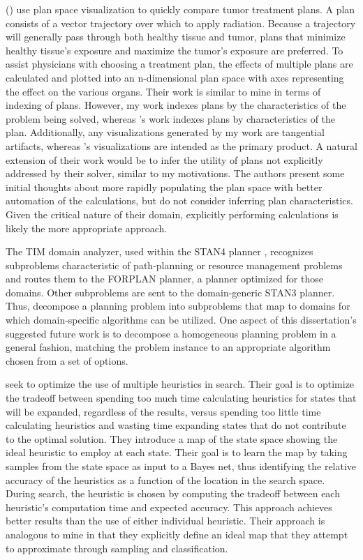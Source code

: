 \citeauthor{gopal02plan} (\citeyear{gopal02plan}) use plan space visualization to quickly compare tumor treatment plans.  A plan consists of a vector trajectory over which to apply radiation.  Because a trajectory will generally pass through both healthy tissue and tumor, plans that minimize healthy tissue's exposure and maximize the tumor's exposure are preferred.  To assist physicians with choosing a treatment plan, the effects of multiple plans are calculated and plotted into an n-dimensional plan space with axes representing the effect on the various organs.  Their work is similar to mine in terms of indexing of plans.  However, my work indexes plans by the characteristics of the problem being solved, whereas \citeauthor{gopal02plan}'s work indexes plans by characteristics of the plan.  Additionally, any visualizations generated by my work are tangential artifacts, whereas \citeauthor{gopal02plan}'s visualizations are intended as the primary product.  A natural extension of their work would be to infer the utility of plans not explicitly addressed by their solver, similar to my motivations.  The authors present some initial thoughts about more rapidly populating the plan space with better automation of the calculations, but do not consider inferring plan characteristics.  Given the critical nature of their domain, explicitly performing calculations is likely the more appropriate approach.

The TIM domain analyzer, used within the STAN4 planner \citep{fox01hybrid}, recognizes subproblems characteristic of path-planning or resource management problems and routes them to the FORPLAN planner, a planner optimized for those domains.  Other subproblems are sent to the domain-generic  STAN3 planner.  Thus, \citeauthor{fox01hybrid} decompose a planning problem into subproblems that map to domains for which domain-specific algorithms can be utilized.  One aspect of this dissertation's suggested future work is to decompose a homogeneous planning problem in a general fashion, matching the problem instance to an appropriate algorithm chosen from a set of options.


\cite{domshla10max} seek to optimize the use of multiple heuristics in search.  Their goal is to optimize the tradeoff between spending too much time calculating heuristics for states that will be expanded, regardless of the results, versus spending too little time calculating heuristics and wasting time expanding states that do not contribute to the optimal solution.  They introduce a map of the state space showing the ideal heuristic to employ at each state. Their goal is to learn the map by taking samples from the state space as input to a Bayes net, thus identifying the relative accuracy of the  heuristics as a function of the location in the search space.  During search, the heuristic is chosen by computing the tradeoff between each heuristic's computation time and expected accuracy. This approach achieves better results than the use of either individual heuristic.  Their approach is analogous to mine in that they explicitly define an ideal map that they attempt to approximate through sampling and classification.


